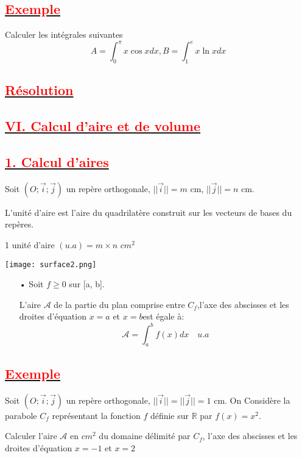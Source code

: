 \documentclass[12pt]{article}
\begin{document}
\subsection*{\underline{\textbf{\textcolor{red}{Exemple}}}}
Calculer les intégrales suivantes 
\[A=\int_{0}^{\pi}x\cos xdx, B=\int_{1}^{e}x\ln x dx\]
\subsection*{\underline{\textbf{\textcolor{red}{Résolution}}}}

\subsection*{\underline{\textbf{\textcolor{red}{VI. Calcul d'aire et de volume }}}}
\subsection*{\underline{\textbf{\textcolor{red}{1. Calcul d'aires}}}}

Soit $(O ; \vec{i} ; \vec{j})$ un repère orthogonale, $||\vec{i}||=m$ cm, $||\vec{j}||=n$ cm.

L'unité d'aire est l'aire du quadrilatère construit sur les vecteurs de bases du repères.

1 unité d'aire $(u.a)=m\times n$ $cm^{2}$

\begin{center}
   \texttt{[image: surface2.png]}
\end{center}
\begin{itemize}
\item[•] Soit $f\geq 0$ sur [a, b].

L'aire $\mathcal{A}$  de la partie du plan comprise entre $C_{f}$,l'axe des abscisses et les droites d'équation $x=a$ et $x=b$est égale à:
\[\mathcal{A}=\int_{a}^{b}f(x)dx\quad u.a\]
\end{itemize}
\subsection*{\underline{\textbf{\textcolor{red}{Exemple }}}}
Soit $(O ; \vec{i} ; \vec{j})$ un repère orthogonale, $||\vec{i}||=||\vec{j}||=1$ cm. On Considère la parabole $C_{f}$ représentant la fonction $f$ définie sur $\mathbb{R}$ par $f(x)=x^{2}$.

Calculer l'aire $\mathcal{A}$ en $cm^{2}$ du domaine délimité par $C_{f}$, l'axe des abscisses et les droites d'équation $x=-1$ et $x=2$
\end{document}
